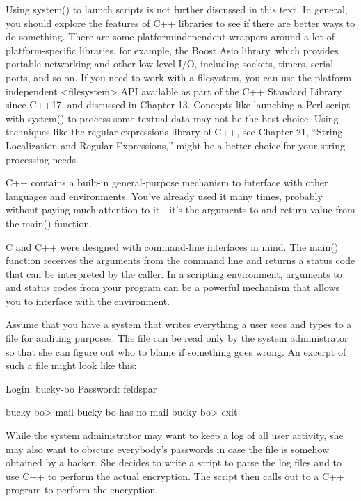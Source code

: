 Using system() to launch scripts is not further discussed in this text. In general, you should explore the features of C++ libraries to see if there are better ways to do something. There are some platformindependent wrappers around a lot of platform-specific libraries, for example, the Boost Asio library, which provides portable networking and other low-level I/O, including sockets, timers, serial ports, and so on. If you need to work with a filesystem, you can use the platform-independent <filesystem> API available as part of the C++ Standard Library since C++17, and discussed in Chapter 13. Concepts like launching a Perl script with system() to process some textual data may not be the best choice. Using techniques like the regular expressions library of C++, see Chapter 21, “String Localization and Regular Expressions,” might be a better choice for your string processing needs.


C++ contains a built-in general-purpose mechanism to interface with other languages and environments. You’ve already used it many times, probably without paying much attention to it—it’s the arguments to and return value from the main() function.

C and C++ were designed with command-line interfaces in mind. The main() function receives the arguments from the command line and returns a status code that can be interpreted by the caller. In a scripting environment, arguments to and status codes from your program can be a powerful mechanism that allows you to interface with the environment.


Assume that you have a system that writes everything a user sees and types to a file for auditing purposes. The file can be read only by the system administrator so that she can figure out who to blame if something goes wrong. An excerpt of such a file might look like this:

\begin{shell}
Login: bucky-bo
Password: feldspar

bucky-bo> mail
bucky-bo has no mail
bucky-bo> exit
\end{shell}

While the system administrator may want to keep a log of all user activity, she may also want to obscure everybody’s passwords in case the file is somehow obtained by a hacker. She decides to write a script to parse the log files and to use C++ to perform the actual encryption. The script then calls out to a C++ program to perform the encryption.

